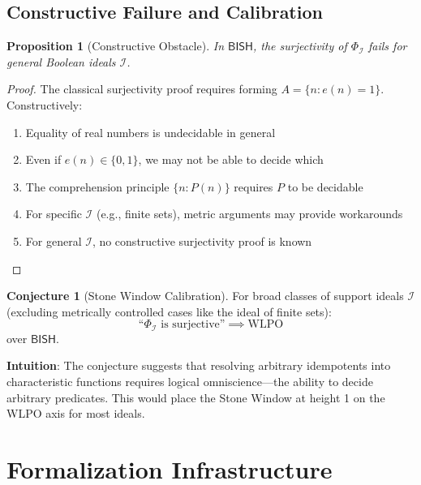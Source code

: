 \documentclass[11pt]{article}
\theoremstyle{plain}
\newtheorem{proposition}[theorem]{Proposition}
\theoremstyle{definition}
\newtheorem{conjecture}[theorem]{Conjecture}
\newcommand{\WLPO}{\mathrm{WLPO}}
\newcommand{\BISH}{\mathsf{BISH}}
\begin{document}
\subsection{Constructive Failure and Calibration}

\begin{proposition}[Constructive Obstacle]\label{prop:constructive-obstacle}
In $\BISH$, the surjectivity of $\Phi_{\mathcal{I}}$ fails for general Boolean ideals $\mathcal{I}$.
\end{proposition}

\begin{proof}
The classical surjectivity proof requires forming $A = \{n : e(n) = 1\}$. Constructively:
\begin{enumerate}
\item Equality of real numbers is undecidable in general
\item Even if $e(n) \in \{0, 1\}$, we may not be able to decide which
\item The comprehension principle $\{n : P(n)\}$ requires $P$ to be decidable
\item For specific $\mathcal{I}$ (e.g., finite sets), metric arguments may provide workarounds
\item For general $\mathcal{I}$, no constructive surjectivity proof is known
\end{enumerate}
\end{proof}

\begin{conjecture}[Stone Window Calibration]\label{conj:stone}
For broad classes of support ideals $\mathcal{I}$ (excluding metrically controlled cases like the ideal of finite sets):
\[
\text{``}\Phi_{\mathcal{I}} \text{ is surjective''} \implies \WLPO
\]
over $\BISH$.
\end{conjecture}

\begin{intuitionbox}
\textbf{Intuition}: The conjecture suggests that resolving arbitrary idempotents into characteristic functions requires logical omniscience—the ability to decide arbitrary predicates. This would place the Stone Window at height 1 on the WLPO axis for most ideals.
\end{intuitionbox}

\section{Formalization Infrastructure}
\end{document}
